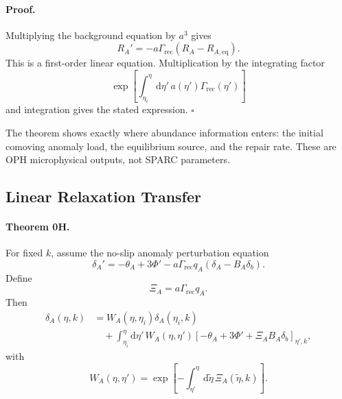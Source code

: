 \documentclass[11pt]{article}
\newcommand{\dd}{\mathrm{d}}
\begin{document}
\paragraph{Proof.}
Multiplying the background equation by \(a^3\) gives
\begin{equation}
  R_A'
  =
  -a\Gamma_{\mathrm{rec}}(R_A-R_{A,\mathrm{eq}}).
\end{equation}
This is a first-order linear equation.  Multiplication by the integrating
factor
\begin{equation}
  \exp\!\left[
    \int_{\eta_i}^{\eta}\dd\eta'\,
      a(\eta')\Gamma_{\mathrm{rec}}(\eta')
  \right]
\end{equation}
and integration gives the stated expression. \(\square\)

The theorem shows exactly where abundance information enters: the initial
comoving anomaly load, the equilibrium source, and the repair rate.  These are
OPH microphysical outputs, not SPARC parameters.

\subsection{Linear Relaxation Transfer}

\paragraph{Theorem 0H.}
For fixed \(k\), assume the no-slip anomaly perturbation equation
\begin{equation}
  \delta_A'
    =-\theta_A+3\Phi'
      -a\Gamma_{\mathrm{rec}}q_A
       (\delta_A-B_A\delta_b).
\end{equation}
Define
\begin{equation}
  \Xi_A=a\Gamma_{\mathrm{rec}}q_A.
\end{equation}
Then
\begin{equation}
\begin{aligned}
  \delta_A(\eta,k)
  &=W_A(\eta,\eta_i)\delta_A(\eta_i,k)\\
  &\quad
  +\int_{\eta_i}^{\eta}\dd\eta'\,
    W_A(\eta,\eta')
    \left[
      -\theta_A+3\Phi'
      +\Xi_A B_A\delta_b
    \right]_{\eta',k},
\end{aligned}
\end{equation}
with
\begin{equation}
  W_A(\eta,\eta')
  =
  \exp\!\left[
    -\int_{\eta'}^{\eta}\dd\tilde\eta\,\Xi_A(\tilde\eta,k)
  \right].
\end{equation}
\end{document}
